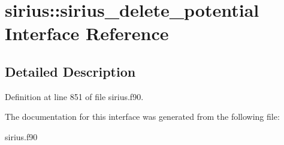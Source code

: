 \hypertarget{interfacesirius_1_1sirius__delete__potential}{}\section{sirius\+:\+:sirius\+\_\+delete\+\_\+potential Interface Reference}
\label{interfacesirius_1_1sirius__delete__potential}


\subsection{Detailed Description}


Definition at line 851 of file sirius.\+f90.



The documentation for this interface was generated from the following file\+:\begin{DoxyCompactItemize}
\item 
sirius.\+f90\end{DoxyCompactItemize}
